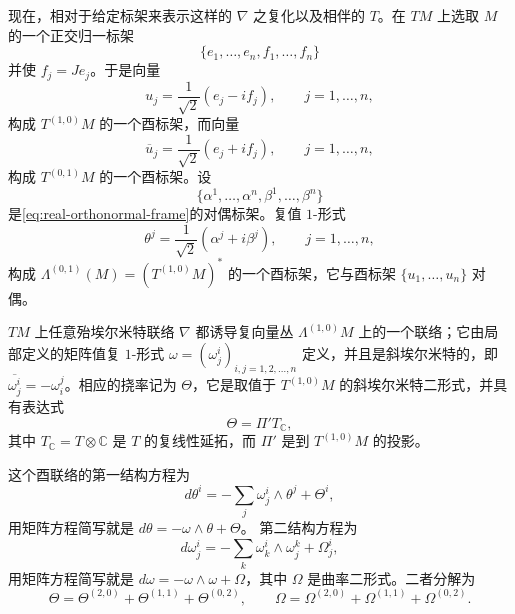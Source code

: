 现在，相对于给定标架来表示这样的 $\nabla$ 之复化以及相伴的 $T$。在 $TM$ 上选取 $M$ 的一个正交归一标架
\begin{equation}
 \{e_1,\ldots,e_n,f_1,\ldots,f_n\}
 \label{eq:real-orthonormal-frame}
\end{equation}
并使 $f_j=Je_j$。于是向量
\[
 u_j=\frac1{\sqrt2}(e_j-if_j),\qquad j=1,\ldots,n,
\]
构成 $T^{(1,0)}M$ 的一个酉标架，而向量
\[
 \overline u_j=\frac1{\sqrt2}(e_j+if_j),\qquad j=1,\ldots,n,
\]
构成 $T^{(0,1)}M$ 的一个酉标架。设
\begin{equation}
 \{\alpha^1,\ldots,\alpha^n,\beta^1,\ldots,\beta^n\}
 \label{eq:dual-real-frame}
\end{equation}
是\eqref{eq:real-orthonormal-frame}的对偶标架。复值 $1$-形式
\[
 \theta^j=\frac1{\sqrt2}(\alpha^j+i\beta^j),\qquad j=1,\ldots,n,
\]
构成 $\Lambda^{(0,1)}(M)=(T^{(1,0)}M)^*$ 的一个酉标架，它与酉标架 $\{u_1,\ldots,u_n\}$ 对偶。

$TM$ 上任意殆埃尔米特联络 $\nabla$ 都诱导复向量丛 $\Lambda^{(1,0)}M$ 上的一个联络；它由局部定义的矩阵值复 $1$-形式
$\omega=(\omega_j^i)_{i,j=1,2,\ldots,n}$ 定义，并且是斜埃尔米特的，即
$\overline{\omega_j^i}=-\omega_i^j$。相应的挠率记为 $\Theta$，它是取值于 $T^{(1,0)}M$ 的斜埃尔米特二形式，并具有表达式
\begin{equation}
 \Theta=\Pi'T_{\mathbb C},
 \label{eq:torsion-projection-complexification}
\end{equation}
其中 $T_{\mathbb C}=T\otimes\mathbb C$ 是 $T$ 的复线性延拓，而 $\Pi'$ 是到 $T^{(1,0)}M$ 的投影。

这个酉联络的第一结构方程为
\begin{equation}
 d\theta^i=-\sum_j\omega_j^i\wedge\theta^j+\Theta^i,
 \label{eq:first-structure-unitary-connection}
\end{equation}
用矩阵方程简写就是 $d\theta=-\omega\wedge\theta+\Theta$。
第二结构方程为
\begin{equation}
 d\omega_j^i=-\sum_k\omega_k^i\wedge\omega_j^k+\Omega_j^i,
 \label{eq:second-structure-unitary-connection}
\end{equation}
用矩阵方程简写就是 $d\omega=-\omega\wedge\omega+\Omega$，其中 $\Omega$ 是曲率二形式。二者分解为
\[
 \Theta=\Theta^{(2,0)}+\Theta^{(1,1)}+\Theta^{(0,2)},
 \qquad
 \Omega=\Omega^{(2,0)}+\Omega^{(1,1)}+\Omega^{(0,2)}.
\]

